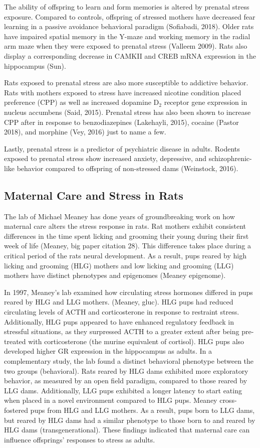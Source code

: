 \documentclass[12pt,twoside]{reedthesis}
\begin{document}
 The ability of offspring to learn and form memories is altered by prenatal
 stress exposure. Compared to controls, offspring of stressed mothers have decreased fear learning in a
 passive avoidance behavioral paradigm (Sofiabadi, 2018). Older rats have impaired spatial memory in the Y-maze and
 working memory in the radial arm maze when they were exposed to prenatal stress
 (Valleem 2009). Rats also display a corresponding
 decrease in CAMKII and CREB mRNA expression in the hippocampus (Sun). 

 Rats exposed to prenatal stress are also more susceptible to addictive behavior.
 Rats with mothers exposed to stress have increased nicotine condition placed
 preference (CPP) as well as increased dopamine D$_2$ receptor gene expression
 in nucleus accumbens (Said, 2015). Prenatal stress has also been shown to
 increase CPP after in response to benzodiazepines (Lakehayli, 2015), cocaine
 (Pastor 2018), and morphine (Vey, 2016) just to name a few.

 Lastly, prenatal stress is a predictor of psychiatric disease in adults.
 Rodents exposed to prenatal stress show increased anxiety, depressive, and
 schizophrenic-like behavior compared to offspring of non-stressed dams
 (Weinstock, 2016). 

 \subsection{Maternal Care and Stress in Rats}
  
The lab of Michael Meaney has done years of groundbreaking work on how maternal
care alters the stress response in rats.  Rat mothers exhibit consistent differences in the time spent licking and grooming
their young during their first week of life (Meaney, big paper citation 28). This difference takes place during a critical period
of the rats neural development. As a result, pups reared by high licking and grooming
(HLG) mothers and low licking and grooming (LLG) mothers have distinct
phenotypes and epigenomes (Meaney epigenome).

In 1997, Meaney's lab examined how circulating stress hormones differed in pups
reared by HLG and LLG mothers. (Meaney, gluc). HLG pups had reduced circulating levels of ACTH and
corticosterone in response to restraint stress. Additionally, HLG pups appeared
to have enhanced regulatory feedback in stressful situations, as they surpressed
ACTH to a greater extent after being pre-treated with corticosterone (the murine
equivalent of cortisol). HLG pups
also developed higher GR expression in the hippocampus as adults. In a
complementary study, the lab found a distinct behavioral phenotype between the
two groups (behavioral). Rats reared by HLG dams exhibited more exploratory
behavior, as measured by an open field paradigm, compared to those reared by LLG
dams. Additionally, LLG pups exhibited a longer latency to start eating when
placed in a novel environment compared to HLG pups. Meaney cross-fostered pups from HLG and
LLG mothers. As a result, pups born to LLG dams, but reared by HLG dams had a
similar phenotype to those born to and reared by HLG dams (transgenerational). These findings
indicated that maternal care can influence offsprings' responses to stress as
adults.
\end{document}
